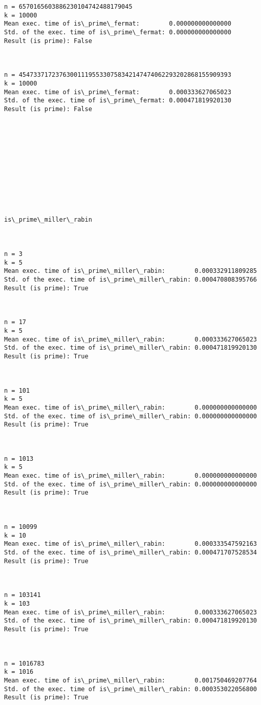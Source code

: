 \documentclass[11pt]{article}
\begin{document}
\begin{Verbatim}[commandchars=\\\{\}]
n = 6570165603886230104742488179045
k = 10000
Mean exec. time of is\_prime\_fermat:        0.000000000000000
Std. of the exec. time of is\_prime\_fermat: 0.000000000000000
Result (is prime): False



n = 4547337172376300111955330758342147474062293202868155909393
k = 10000
Mean exec. time of is\_prime\_fermat:        0.000333627065023
Std. of the exec. time of is\_prime\_fermat: 0.000471819920130
Result (is prime): False












is\_prime\_miller\_rabin



n = 3
k = 5
Mean exec. time of is\_prime\_miller\_rabin:        0.000332911809285
Std. of the exec. time of is\_prime\_miller\_rabin: 0.000470808395766
Result (is prime): True



n = 17
k = 5
Mean exec. time of is\_prime\_miller\_rabin:        0.000333627065023
Std. of the exec. time of is\_prime\_miller\_rabin: 0.000471819920130
Result (is prime): True



n = 101
k = 5
Mean exec. time of is\_prime\_miller\_rabin:        0.000000000000000
Std. of the exec. time of is\_prime\_miller\_rabin: 0.000000000000000
Result (is prime): True



n = 1013
k = 5
Mean exec. time of is\_prime\_miller\_rabin:        0.000000000000000
Std. of the exec. time of is\_prime\_miller\_rabin: 0.000000000000000
Result (is prime): True



n = 10099
k = 10
Mean exec. time of is\_prime\_miller\_rabin:        0.000333547592163
Std. of the exec. time of is\_prime\_miller\_rabin: 0.000471707528534
Result (is prime): True



n = 103141
k = 103
Mean exec. time of is\_prime\_miller\_rabin:        0.000333627065023
Std. of the exec. time of is\_prime\_miller\_rabin: 0.000471819920130
Result (is prime): True



n = 1016783
k = 1016
Mean exec. time of is\_prime\_miller\_rabin:        0.001750469207764
Std. of the exec. time of is\_prime\_miller\_rabin: 0.000353022056800
Result (is prime): True




\end{Verbatim}
\end{document}
